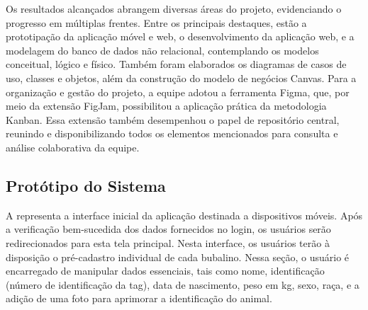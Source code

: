 Os resultados alcançados abrangem diversas áreas do projeto, evidenciando o progresso em múltiplas frentes. Entre os principais destaques, estão a prototipação da aplicação móvel e web, o desenvolvimento da aplicação web, e a modelagem do banco de dados não relacional, contemplando os modelos conceitual, lógico e físico. Também foram elaborados os diagramas de casos de uso, classes e objetos, além da construção do modelo de negócios Canvas. Para a organização e gestão do projeto, a equipe adotou a ferramenta Figma, que, por meio da extensão FigJam, possibilitou a aplicação prática da metodologia Kanban. Essa extensão também desempenhou o papel de repositório central, reunindo e disponibilizando todos os elementos mencionados para consulta e análise colaborativa da equipe.

\subsection*{Protótipo do Sistema}

A  representa a interface inicial da aplicação destinada a dispositivos móveis. Após a verificação bem-sucedida dos dados fornecidos no login, os usuários serão redirecionados para esta tela principal. Nesta interface, os usuários terão à disposição o pré-cadastro individual de cada bubalino. Nessa seção, o usuário é encarregado de manipular dados essenciais, tais como nome, identificação (número de identificação da tag), data de nascimento, peso em kg, sexo, raça, e a adição de uma foto para aprimorar a identificação do animal.

